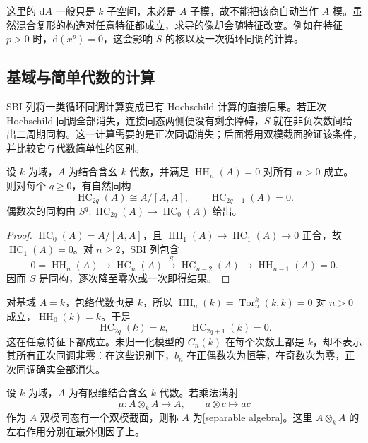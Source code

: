 这里的 \(\mathrm dA\) 一般只是 \(k\) 子空间，未必是 \(A\) 子模，故不能把该商自动当作 \(A\) 模。虽然混合复形的构造对任意特征都成立，求导的像却会随特征改变。例如在特征 \(p>0\) 时，\(\mathrm d(x^p)=0\)，这会影响 \(S\) 的核以及一次循环同调的计算。

\subsection{基域与简单代数的计算}
\label{b4:subsec:1305:03}

SBI 列将一类循环同调计算变成已有 Hochschild 计算的直接后果。若正次 Hochschild 同调全部消失，连接同态两侧便没有剩余障碍，\(S\) 就在非负次数间给出二周期同构。这一计算需要的是正次同调消失；后面将用双模截面验证该条件，并比较它与代数简单性的区别。

\begin{proposition}\label{b4:prop:cyclic-hh-vanishing}
	设 \(k\) 为域，\(A\) 为结合含幺 \(k\) 代数，并满足 \(\operatorname{HH}_n(A)=0\) 对所有 \(n>0\) 成立。则对每个 \(q\ge0\)，有自然同构
	\[
		\operatorname{HC}_{2q}(A)\cong A/[A,A],\qquad
		\operatorname{HC}_{2q+1}(A)=0.
	\]
	偶数次的同构由 \(S^q:\operatorname{HC}_{2q}(A)\to\operatorname{HC}_0(A)\) 给出。
\end{proposition}
\begin{proof}
	\(\operatorname{HC}_0(A)=A/[A,A]\)，且 \(\operatorname{HH}_1(A)\to\operatorname{HC}_1(A)\to0\) 正合，故 \(\operatorname{HC}_1(A)=0\)。对 \(n\ge2\)，SBI 列包含
	\[
		0=\operatorname{HH}_n(A)\longrightarrow\operatorname{HC}_n(A)
		\xrightarrow{S}\operatorname{HC}_{n-2}(A)
		\longrightarrow\operatorname{HH}_{n-1}(A)=0.
	\]
	因而 \(S\) 是同构，逐次降至零次或一次即得结果。
\end{proof}

对基域 \(A=k\)，包络代数也是 \(k\)，所以 \(\operatorname{HH}_n(k)=\operatorname{Tor}^k_n(k,k)=0\) 对 \(n>0\) 成立，\(\operatorname{HH}_0(k)=k\)。于是
\[
	\operatorname{HC}_{2q}(k)=k,\qquad\operatorname{HC}_{2q+1}(k)=0.
\]
这在任意特征下都成立。未归一化模型的 \(C_n(k)\) 在每个次数上都是 \(k\)，却不表示其所有正次同调非零：在这些识别下，\(b_n\) 在正偶数次为恒等，在奇数次为零，正次同调确实全部消失。

\begin{definition}\label{b4:def:separable-algebra-bimodule}
	设 \(k\) 为域，\(A\) 为有限维结合含幺 \(k\) 代数。若乘法满射
	\[
		\mu:A\otimes_k A\longrightarrow A,\qquad a\otimes c\longmapsto ac
	\]
	作为 \(A\) 双模同态有一个双模截面，则称 \(A\) 为[separable algebra]。这里 \(A\otimes_k A\) 的左右作用分别在最外侧因子上。
\end{definition}

